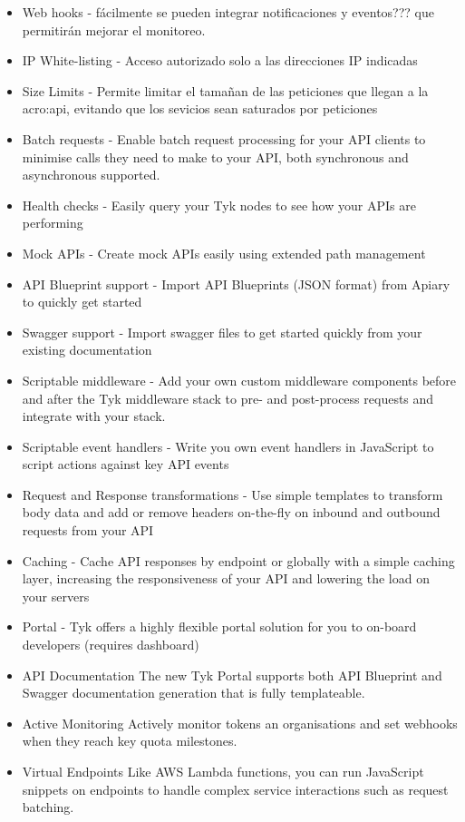 \begin{itemize}
  \item Web hooks - fácilmente se pueden integrar notificaciones y eventos??? que permitirán mejorar el monitoreo.
  \item IP White-listing - Acceso autorizado solo a las direcciones IP indicadas
  \item Size Limits - Permite limitar el tamañan de las peticiones que llegan a la \gls{acro:api}, evitando que los sevicios sean saturados por peticiones
  \item Batch requests - Enable batch request processing for your API clients to minimise calls they need to make to your API, both synchronous and asynchronous supported.
  \item Health checks - Easily query your Tyk nodes to see how your APIs are performing
  \item Mock APIs - Create mock APIs easily using extended path management
  \item API Blueprint support - Import API Blueprints (JSON format) from Apiary to quickly get started
  \item Swagger support - Import swagger files to get started quickly from your existing documentation
  \item Scriptable middleware - Add your own custom middleware components before and after the Tyk middleware stack to pre- and post-process requests and integrate with your stack.
  \item Scriptable event handlers - Write you own event handlers in JavaScript to script actions against key API events
  \item Request and Response transformations - Use simple templates to transform body data and add or remove headers on-the-fly on inbound and outbound requests from your API
  \item Caching - Cache API responses by endpoint or globally with a simple caching layer, increasing the responsiveness of your API and lowering the load on your servers
  \item Portal - Tyk offers a highly flexible portal solution for you to on-board developers (requires dashboard)
  \item API Documentation The new Tyk Portal supports both API Blueprint and Swagger documentation generation that is fully templateable.
  \item Active Monitoring Actively monitor tokens an organisations and set webhooks when they reach key quota milestones.
  \item Virtual Endpoints Like AWS Lambda functions, you can run JavaScript snippets on endpoints to handle complex service interactions such as request batching.

\end{itemize}
